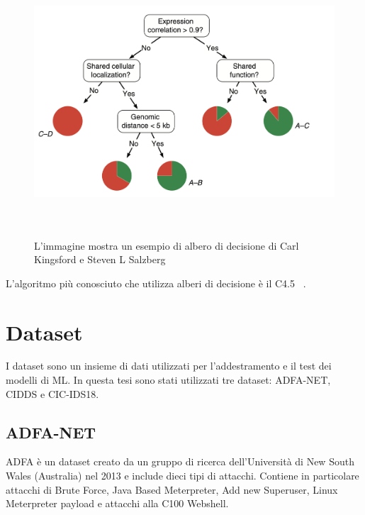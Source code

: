 \begin{figure}[htpb]
    \centering
    \includegraphics[width=\textwidth,height=10cm,keepaspectratio=true]{img/albero_di_decisione.png}
    \caption{
        L'immagine mostra un esempio di albero di decisione di Carl Kingsford e Steven L Salzberg ~\cite{kingsfordWhatAreDecision2008}
    }
    \label{fig:decision_tree}
\end{figure}



L'algoritmo più conosciuto che utilizza alberi di decisione è il C4.5 ~\cite{salzbergC4ProgramsMachine1994}.


\section{Dataset}

I dataset sono un insieme di dati utilizzati per l'addestramento e il test dei modelli di ML. In questa tesi sono stati utilizzati tre dataset: ADFA-NET, CIDDS e CIC-IDS18.

\subsection{ADFA-NET}

ADFA è un dataset creato da un gruppo di ricerca dell'Università di New South Wales (Australia) nel 2013 e include dieci tipi di attacchi. Contiene in particolare attacchi di Brute Force, Java Based Meterpreter, Add new Superuser, Linux Meterpreter payload e attacchi alla C100 Webshell. ~\cite{sharafaldinGeneratingNewIntrusion2018}

